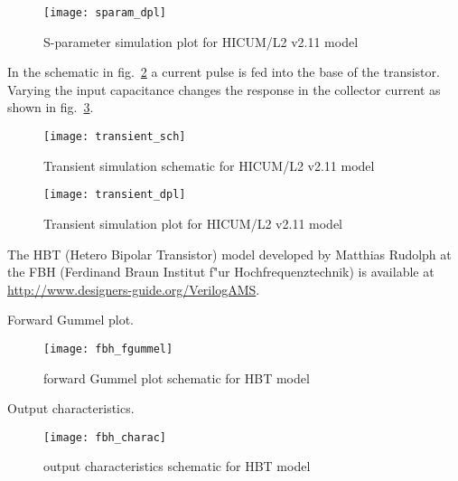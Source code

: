 \begin{figure}[ht]
\begin{center}
\texttt{[image: sparam\_dpl]}
\end{center}
\caption{S-parameter simulation plot for HICUM/L2 v2.11 model}
\label{fig:sparam_dpl}
\end{figure}
\FloatBarrier


In the schematic in fig.~\ref{fig:transient_sch} a current pulse is
fed into the base of the transistor.  Varying the input capacitance
changes the response in the collector current as shown in
fig.~\ref{fig:transient_dpl}.

\begin{figure}[ht]
\begin{center}
\texttt{[image: transient\_sch]}
\end{center}
\caption{Transient simulation schematic for HICUM/L2 v2.11 model}
\label{fig:transient_sch}
\end{figure}
\FloatBarrier

\begin{figure}[ht]
\begin{center}
\texttt{[image: transient\_dpl]}
\end{center}
\caption{Transient simulation plot for HICUM/L2 v2.11 model}
\label{fig:transient_dpl}
\end{figure}
\FloatBarrier


The HBT (Hetero Bipolar Transistor) model developed by Matthias
Rudolph at the FBH (Ferdinand Braun Institut f"ur Hochfrequenztechnik)
is available at \url{http://www.designers-guide.org/VerilogAMS}.


Forward Gummel plot.

\begin{figure}[ht]
\begin{center}
\texttt{[image: fbh\_fgummel]}
\end{center}
\caption{forward Gummel plot schematic for HBT model}
\label{fig:fbh_fgummel}
\end{figure}
\FloatBarrier


Output characteristics.

\begin{figure}[ht]
\begin{center}
\texttt{[image: fbh\_charac]}
\end{center}
\caption{output characteristics schematic for HBT model}
\label{fig:fbh_charac}
\end{figure}
\FloatBarrier


